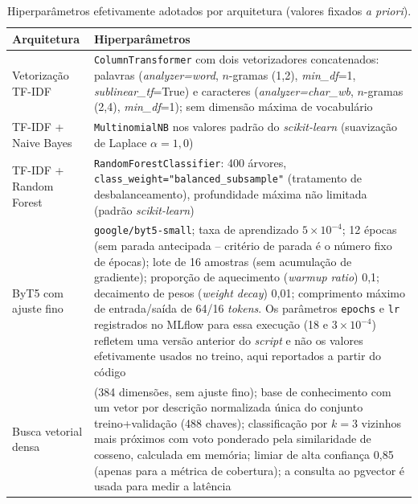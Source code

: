 \begin{table}[htb]
\centering
\caption{Hiperparâmetros efetivamente adotados por arquitetura (valores fixados \textit{a priori}).}
\label{tab:hiperparametros}
\small
\begin{tabular}{@{}>{\raggedright\arraybackslash}p{3.2cm} >{\raggedright\arraybackslash}p{11.6cm}@{}}
	\toprule
	\textbf{Arquitetura} & \textbf{Hiperparâmetros} \\
	\midrule
	Vetorização TF-IDF & \texttt{ColumnTransformer} com dois vetorizadores concatenados: palavras (\textit{analyzer=word}, $n$-gramas (1,2), \textit{min\_df}=1, \textit{sublinear\_tf}=True) e caracteres (\textit{analyzer=char\_wb}, $n$-gramas (2,4), \textit{min\_df}=1); sem dimensão máxima de vocabulário \\
	\addlinespace
	TF-IDF + Naive Bayes & \texttt{MultinomialNB} nos valores padrão do \textit{scikit-learn} (suavização de Laplace $\alpha=1{,}0$) \\
	\addlinespace
	TF-IDF + Random Forest & \texttt{RandomForestClassifier}: 400 árvores, \texttt{class\_weight="balanced\_subsample"} (tratamento de desbalanceamento), profundidade máxima não limitada (padrão \textit{scikit-learn}) \\
	\addlinespace
	ByT5 com ajuste fino & \texttt{google/byt5-small}; taxa de aprendizado $5\times10^{-4}$; 12 épocas (sem parada antecipada -- critério de parada é o número fixo de épocas); lote de 16 amostras (sem acumulação de gradiente); proporção de aquecimento (\textit{warmup ratio}) 0,1; decaimento de pesos (\textit{weight decay}) 0,01; comprimento máximo de entrada/saída de 64/16 \textit{tokens}. Os parâmetros \texttt{epochs} e \texttt{lr} registrados no MLflow para essa execução (18 e $3\times10^{-4}$) refletem uma versão anterior do \textit{script} e não os valores efetivamente usados no treino, aqui reportados a partir do código \\
	\addlinespace
	Busca vetorial densa & \modelemb{} (384 dimensões, sem ajuste fino); base de conhecimento com um vetor por descrição normalizada única do conjunto treino+validação (488 chaves); classificação por $k = 3$ vizinhos mais próximos com voto ponderado pela similaridade de cosseno, calculada em memória; limiar de alta confiança 0,85 (apenas para a métrica de cobertura); a consulta ao pgvector é usada para medir a latência \\
	\bottomrule
\end{tabular}
\end{table}

